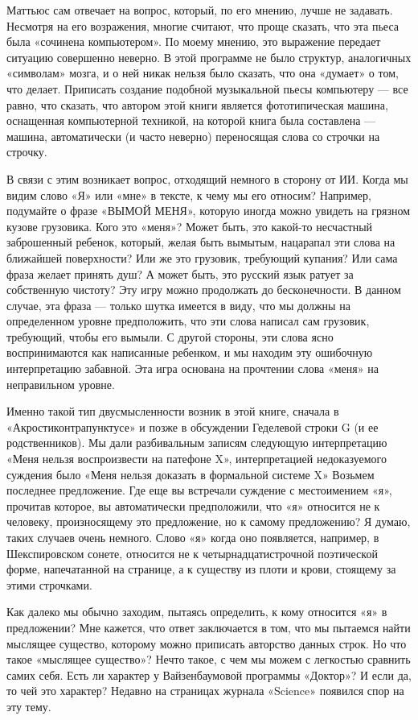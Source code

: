Маттьюс сам отвечает на вопрос, который, по его мнению, лучше не задавать. Несмотря на его возражения, многие считают, что проще сказать, что эта пьеса была «сочинена компьютером». По моему мнению, это выражение передает ситуацию совершенно неверно. В этой программе не было структур, аналогичных «символам» мозга, и о ней никак нельзя было сказать, что она «думает» о том, что делает. Приписать создание подобной музыкальной пьесы компьютеру --- все равно, что сказать, что автором этой книги является фототипическая машина, оснащенная компьютерной техникой, на которой книга была составлена --- машина, автоматически (и часто неверно) переносящая слова со строчки на строчку.

В связи с этим возникает вопрос, отходящий немного в сторону от ИИ. Когда мы видим слово «Я» или «мне» в тексте, к чему мы его относим? Например, подумайте о фразе «ВЫМОЙ МЕНЯ», которую иногда можно увидеть на грязном кузове грузовика. Кого это «меня»? Может быть, это какой-то несчастный заброшенный ребенок, который, желая быть вымытым, нацарапал эти слова на ближайшей поверхности? Или же это грузовик, требующий купания? Или сама фраза желает принять душ? А может быть, это русский язык ратует за собственную чистоту? Эту игру можно продолжать до бесконечности. В данном случае, эта фраза --- только шутка имеется в виду, что мы должны на определенном уровне предположить, что эти слова написал сам грузовик, требующий, чтобы его вымыли. С другой стороны, эти слова ясно воспринимаются как написанные ребенком, и мы находим эту ошибочную интерпретацию забавной. Эта игра основана на прочтении слова «меня» на неправильном уровне.

Именно такой тип двусмысленности возник в этой книге, сначала в «Акростиконтрапунктусе» и позже в обсуждении Геделевой строки G (и ее родственников). Мы дали разбивальным записям следующую интерпретацию «Меня нельзя воспроизвести на патефоне X», интерпретацией недоказуемого суждения было «Меня нельзя доказать в формальной системе X» Возьмем последнее предложение. Где еще вы встречали суждение с местоимением «я», прочитав которое, вы автоматически предположили, что «я» относится не к человеку, произносящему это предложение, но к самому предложению? Я думаю, таких случаев очень немного. Слово «я» когда оно появляется, например, в Шекспировском сонете, относится не к четырнадцатистрочной поэтической форме, напечатанной на странице, а к существу из плоти и крови, стоящему за этими строчками.

Как далеко мы обычно заходим, пытаясь определить, к кому относится «я» в предложении? Мне кажется, что ответ заключается в том, что мы пытаемся найти мыслящее существо, которому можно приписать авторство данных строк. Но что такое «мыслящее существо»? Нечто такое, с чем мы можем с легкостью сравнить самих себя. Есть ли характер у Вайзенбаумовой программы «Доктор»? И если да, то чей это характер? Недавно на страницах журнала «Science» появился спор на эту тему.

